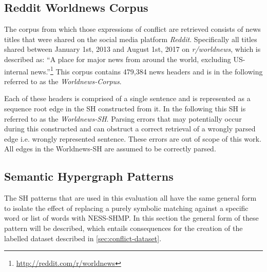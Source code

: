 \documentclass[11pt]{scrreprt}
\let\citef\cite  %
\let\cite\parencite  %
\begin{document}
\subsection{Reddit Worldnews Corpus}
The corpus from which those expressions of conflict are retrieved consists of news titles that were shared on the social media platform \textit{Reddit}. Specifically all titles shared between January 1st, 2013 and August 1st, 2017 on \textit{r/worldnews}, which is described as: “A place for major news from around the world, excluding US-internal news.”\footnote{\url{http://reddit.com/r/worldnews}} This corpus contains 479,384 news headers and is in the following referred to as the \textit{Worldnews-Corpus}.

Each of these headers is comprised of a single sentence and is represented as a sequence root edge in the SH constructed from it. In the following this SH is referred to as the \textit{Worldnews-SH}. Parsing errors that may potentially occur during this constructed and can obstruct a correct retrieval of a wrongly parsed edge i.e. wrongly represented sentence. These errors are out of scope of this work. All edges in the Worldnews-SH are assumed to be correctly parsed.

%


\subsection{Semantic Hypergraph Patterns}
\label{sec:sh-patterns}
The SH patterns that are used in this evaluation all have the same general form to isolate the effect of replacing a purely symbolic matching against a specific word or list of words with NESS-SHMP. In this section the general form of these pattern will be described, which entails consequences for the creation of the labelled dataset described in \cref{sec:conflict-dataset}. 

\end{document}
